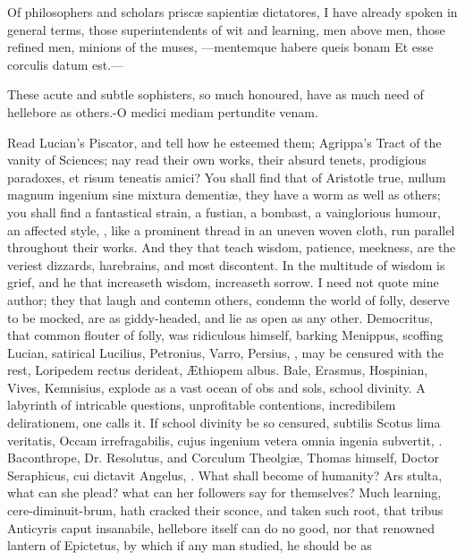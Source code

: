 {Of philosophers and scholars prisc\ae{} sapienti\ae{} dictatores, I have
already spoken in general terms, those superintendents of wit and
learning, men above men, those refined men, minions of the muses,
---mentemque habere queis bonam
Et esse corculis datum est.---

These acute and subtle sophisters, so much honoured, have as much
need of hellebore as others.-O medici mediam pertundite venam.

Read Lucian's Piscator, and tell how he esteemed them; Agrippa's Tract
of the vanity of Sciences; nay read their own works, their absurd
tenets, prodigious paradoxes, et risum teneatis amici? You shall find
that of Aristotle true, nullum magnum ingenium sine mixtura dementi\ae{},
they have a worm as well as others; you shall find a fantastical
strain, a fustian, a bombast, a vainglorious humour, an affected style,
\etc{}, like a prominent thread in an uneven woven cloth, run parallel
throughout their works. And they that teach wisdom, patience, meekness,
are the veriest dizzards, harebrains, and most discontent. In the
multitude of wisdom is grief, and he that increaseth wisdom, increaseth
sorrow. I need not quote mine author; they that laugh and contemn
others, condemn the world of folly, deserve to be mocked, are as
giddy-headed, and lie as open as any other. Democritus, that
common flouter of folly, was ridiculous himself, barking Menippus,
scoffing Lucian, satirical Lucilius, Petronius, Varro, Persius, \etc{},
may be censured with the rest, Loripedem rectus derideat, \AE{}thiopem
albus. Bale, Erasmus, Hospinian, Vives, Kemnisius, explode as a vast
ocean of obs and sols, school divinity. A labyrinth of intricable
questions, unprofitable contentions, incredibilem delirationem, one
calls it. If school divinity be so censured, subtilis Scotus lima
veritatis, Occam irrefragabilis, cujus ingenium vetera omnia ingenia
subvertit, \etc{}. Baconthrope, Dr. Resolutus, and Corculum Theolgi\ae{},
Thomas himself, Doctor Seraphicus, cui dictavit Angelus, \etc{}. What
shall become of humanity? Ars stulta, what can she plead? what can her
followers say for themselves? Much learning,  cere-diminuit-brum,
hath cracked their sconce, and taken such root, that tribus Anticyris
caput insanabile, hellebore itself can do no good, nor that renowned
lantern of Epictetus, by which if any man studied, he should be as
}
